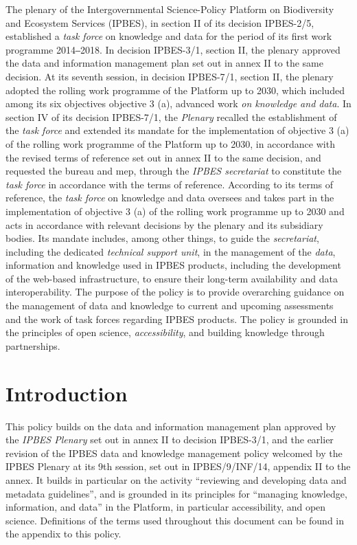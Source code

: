 \documentclass{article}
\begin{document}
The \gls{plenary} of the Intergovernmental Science-Policy Platform on Biodiversity and Ecosystem Services (IPBES), in section II of its decision IPBES-2/5, established a \textit{task force} on knowledge and data for the period of its first work programme 2014‒2018. In decision IPBES-3/1, section II, the \gls{plenary} approved the data and information management plan set out in annex II to the same decision. At its seventh session, in decision IPBES-7/1, section II, the \gls{plenary} adopted the rolling work programme of the Platform up to 2030, which included among its six objectives objective 3 (a), advanced work \textit{on knowledge and data}. In section IV of its decision IPBES-7/1, the \textit{Plenary }recalled the establishment of the \textit{task force} and extended its mandate for the implementation of objective 3 (a) of the rolling work programme of the Platform up to 2030, in accordance with the revised terms of reference set out in annex II to the same decision, and requested the \gls{bureau} and \gls{mep}, through the \textit{IPBES secretariat} to constitute the \textit{task force} in accordance with the terms of reference. According to its terms of reference, the \textit{task force} on knowledge and data oversees and takes part in the implementation of objective 3 (a) of the rolling work programme up to 2030 and acts in accordance with relevant decisions by the \gls{plenary} and its subsidiary bodies. Its mandate includes, among other things, to guide the \textit{secretariat}, including the dedicated \textit{technical support unit}, in the management of the \textit{data}, information and knowledge used in \gls{IPBES products}, including the development of the web-based infrastructure, to ensure their long-term availability and data interoperability. The purpose of the policy is to provide overarching guidance on the management of data and
knowledge to current and upcoming assessments and the work of task forces regarding IPBES products. The
policy is grounded in the principles of open science, \textit{accessibility}, and building knowledge through
partnerships.

\section{Introduction}

This policy builds on the data and information management plan approved by the \textit{IPBES Plenary} set out in annex II to decision IPBES-3/1, and the earlier revision of the IPBES data and knowledge management policy
welcomed by the IPBES Plenary at its 9th session, set out in IPBES/9/INF/14, appendix II to the annex. It builds
in particular on the activity “reviewing and developing data and metadata guidelines”, and is grounded in its
principles for “managing knowledge, information, and data” in the Platform, in particular accessibility, and
open science. Definitions of the terms used throughout this document can be found in the appendix to this
policy.
\end{document}
